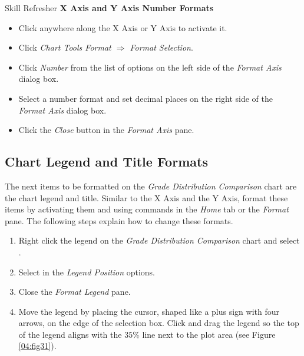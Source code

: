 \begin{center}
	\begin{sklbox}{Skill Refresher}
		\textbf{X Axis and Y Axis Number Formats}
		\\
		\begin{itemize}
			\setlength{\itemsep}{0pt}
			\setlength{\parskip}{0pt}
			\setlength{\parsep}{0pt}

			\item Click anywhere along the X Axis or Y Axis to activate it.
			\item Click \textit{Chart Tools Format $ \Rightarrow $ Format Selection}.
			\item Click \textit{Number} from the list of options on the left side of the \textit{Format Axis} dialog box.
			\item Select a number format and set decimal places on the right side of the \textit{Format Axis} dialog box.
			\item Click the \textit{Close} button in the \textit{Format Axis} pane.
			
		\end{itemize}
	\end{sklbox}
\end{center}

\subsection{Chart Legend and Title Formats}

The next items to be formatted on the \textit{Grade Distribution Comparison} chart are the chart legend and title. Similar to the X Axis and the Y Axis, format these items by activating them and using commands in the \textit{Home} tab or the \textit{Format} pane. The following steps explain how to change these formats.

\begin{enumerate}
	\item Right click the legend on the \textit{Grade Distribution Comparison} chart and select .
	\item Select  in the \textit{Legend Position} options. 
	\item Close the \textit{Format Legend} pane.
	\item Move the legend by placing the cursor, shaped like a plus sign with four arrows, on the edge of the selection box. Click and drag the legend so the top of the legend aligns with the $ 35\% $ line next to the plot area (see Figure \ref{04:fig31}).
\end{enumerate}

